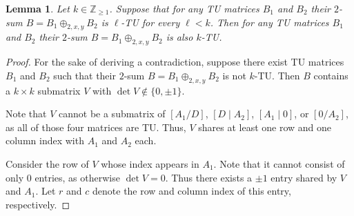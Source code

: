\documentclass{article}
\newtheorem{lemma}{Lemma}
\theoremstyle{definition}
\begin{document}
\begin{lemma}\label{lem:two_sum_reg_det_induction}
    Let $k \in \mathbb{Z}_{\geq 1}$. Suppose that for any TU matrices $B_{1}$ and $B_{2}$ their $2$-sum $B = B_{1} \oplus_{2, x, y} B_{2}$ is $\ell$-TU for every $\ell < k$. Then for any TU matrices $B_{1}$ and $B_{2}$ their $2$-sum $B = B_{1} \oplus_{2, x, y} B_{2}$ is also $k$-TU.
\end{lemma}

\begin{proof}
    For the sake of deriving a contradiction, suppose there exist TU matrices $B_{1}$ and $B_{2}$ such that their $2$-sum $B = B_{1} \oplus_{2, x, y} B_{2}$ is not $k$-TU. Then $B$ contains a $k \times k$ submatrix $V$ with $\det V \notin \{0, \pm 1\}$.

    Note that $V$ cannot be a submatrix of $\left[A_{1} / D\right]$, $\left[D \mid A_{2}\right]$, $\left[A_{1} \mid 0\right]$, or $\left[0 / A_{2}\right]$, as all of those four matrices are TU. Thus, $V$ shares at least one row and one column index with $A_{1}$ and $A_{2}$ each.

    Consider the row of $V$ whose index appears in $A_{1}$. Note that it cannot consist of only $0$ entries, as otherwise $\det V = 0$. Thus there exists a $\pm 1$ entry shared by $V$ and $A_{1}$. Let $r$ and $c$ denote the row and column index of this entry, respectively.


\end{proof}
\end{document}
